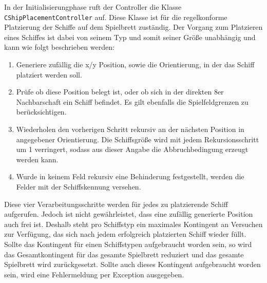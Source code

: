 In der Initialisierungphase ruft der Controller die Klasse \texttt{CShipPlacementController} auf.
Diese Klasse ist für die regelkonforme Platzierung der Schiffe auf dem Spielbrett zuständig.
Der Vorgang zum Platzieren eines Schiffes ist dabei von seinem Typ und somit seiner Größe unabhängig und kann wie folgt beschrieben werden:
\begin{enumerate}
	\item Generiere zufällig die x/y Position, sowie die Orientierung, in der das Schiff platziert werden soll.
	\item Prüfe ob diese Position belegt ist, oder ob sich in der direkten 8er Nachbarschaft ein Schiff befindet. 
	Es gilt ebenfalls die Spielfeldgrenzen zu berücksichtigen.
	\item Wiederholen den vorherigen Schritt rekursiv an der nächsten Position in angegebener Orientierung. 
	Die Schiffsgröße wird mit jedem Rekursionsschritt um 1 verringert, sodass aus dieser Angabe die Abbruchbedingung erzeugt werden kann.
	\item Wurde in keinem Feld rekursiv eine Behinderung festgestellt, werden die Felder mit der Schiffskennung versehen.
\end{enumerate}
Diese vier Verarbeitungsschritte werden für jedes zu platzierende Schiff aufgerufen.
Jedoch ist nicht gewährleistet, dass eine zufällig generierte Position auch frei ist.
Deshalb steht pro Schiffstyp ein maximales Kontingent an Versuchen zur Verfügung, das sich nach jedem erfolgreich platzierten Schiff wieder füllt.
Sollte das Kontingent für einen Schiffstypen aufgebraucht worden sein, so wird das Gesamtkontingent für das gesamte Spielbrett reduziert und das gesamte Spielbrett wird zurückgesetzt.
Sollte auch dieses Kontingent aufgebraucht worden sein, wird eine Fehlermeldung per Exception ausgegeben.